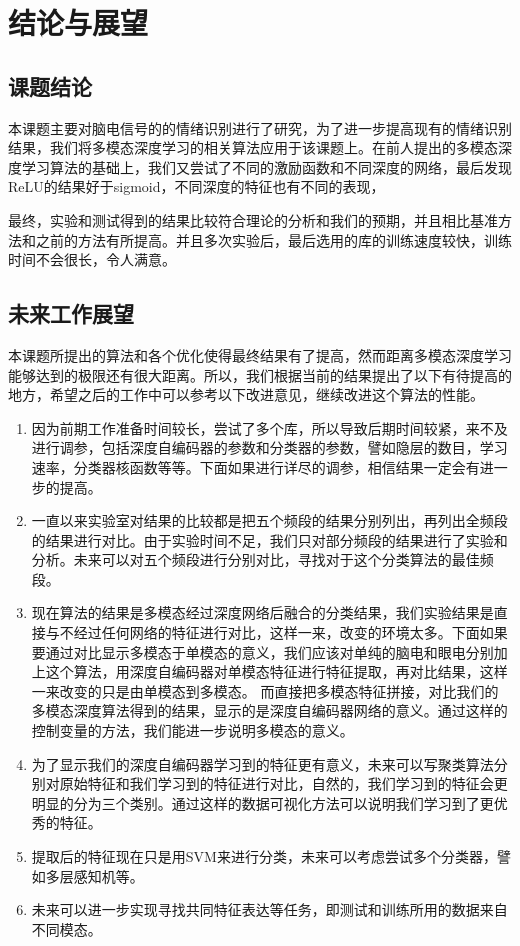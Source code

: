 
\chapter{结论与展望}
\label{chap:chap8}
\section{课题结论}{
	本课题主要对脑电信号的的情绪识别进行了研究，为了进一步提高现有的情绪识别结果，我们将多模态深度学习的相关算法应用于该课题上。在前人提出的多模态深度学习算法的基础上，我们又尝试了不同的激励函数和不同深度的网络，最后发现ReLU的结果好于sigmoid，不同深度的特征也有不同的表现，
	
	最终，实验和测试得到的结果比较符合理论的分析和我们的预期，并且相比基准方法和之前的方法有所提高。并且多次实验后，最后选用的库的训练速度较快，训练时间不会很长，令人满意。
}
\section{未来工作展望}

	本课题所提出的算法和各个优化使得最终结果有了提高，然而距离多模态深度学习能够达到的极限还有很大距离。所以，我们根据当前的结果提出了以下有待提高的地方，希望之后的工作中可以参考以下改进意见，继续改进这个算法的性能。
	\begin{enumerate}
		\item 因为前期工作准备时间较长，尝试了多个库，所以导致后期时间较紧，来不及进行调参，包括深度自编码器的参数和分类器的参数，譬如隐层的数目，学习速率，分类器核函数等等。下面如果进行详尽的调参，相信结果一定会有进一步的提高。
		\item 一直以来实验室对结果的比较都是把五个频段的结果分别列出，再列出全频段的结果进行对比。由于实验时间不足，我们只对部分频段的结果进行了实验和分析。未来可以对五个频段进行分别对比，寻找对于这个分类算法的最佳频段。
		\item 现在算法的结果是多模态经过深度网络后融合的分类结果，我们实验结果是直接与不经过任何网络的特征进行对比，这样一来，改变的环境太多。下面如果要通过对比显示多模态于单模态的意义，我们应该对单纯的脑电和眼电分别加上这个算法，用深度自编码器对单模态特征进行特征提取，再对比结果，这样一来改变的只是由单模态到多模态。 而直接把多模态特征拼接，对比我们的多模态深度算法得到的结果，显示的是深度自编码器网络的意义。通过这样的控制变量的方法，我们能进一步说明多模态的意义。
		\item 为了显示我们的深度自编码器学习到的特征更有意义，未来可以写聚类算法分别对原始特征和我们学习到的特征进行对比，自然的，我们学习到的特征会更明显的分为三个类别。通过这样的数据可视化方法可以说明我们学习到了更优秀的特征。
		\item 提取后的特征现在只是用SVM来进行分类，未来可以考虑尝试多个分类器，譬如多层感知机等。
		\item 未来可以进一步实现寻找共同特征表达等任务，即测试和训练所用的数据来自不同模态。
	\end{enumerate}